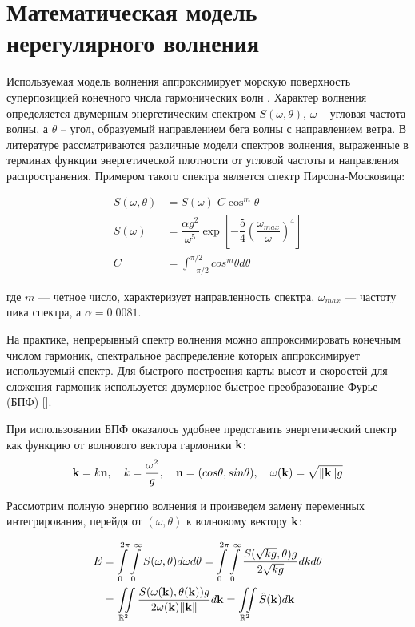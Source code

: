 \section{Математическая модель нерегулярного волнения}

Используемая модель волнения аппроксимирует морскую поверхность суперпозицией конечного числа гармонических волн \cite{lopatuhin2004}. Характер волнения определяется двумерным энергетическим спектром $S(\omega, \theta)$, $\omega$ -- угловая частота волны, а $\theta$ -- угол, образуемый направлением бега волны с направлением ветра. В литературе \cite{lopatuhin2004} рассматриваются различные модели спектров волнения, выраженные в терминах функции энергетической плотности от угловой частоты и направления распространения. Примером такого спектра является спектр Пирсона-Московица:

\begin{equation}
	\begin{split}
	S(\omega, \theta) &= S(\omega) \; C \cos^m\theta \\
	S(\omega) &= \dfrac{\alpha g^2}{\omega^5} \exp \left[ 
	  -\dfrac{5}{4} \left( \dfrac{\omega_{max}}{\omega} \right)^{4} 
	\right]  \\
	C &= \int_{-\pi/2}^{\pi/2} cos^m\theta d\theta
	\end{split}
\end{equation}

где $m$ --- четное число, характеризует направленность спектра, $\omega_{max}$ --- частоту пика спектра, а $\alpha = 0.0081$.

На практике, непрерывный спектр волнения можно аппроксимировать конечным числом гармоник, спектральное распределение которых аппроксимирует используемый спектр. Для быстрого построения карты высот и скоростей для сложения гармоник используется двумерное быстрое преобразование Фурье (БПФ) [].
 
При использовании БПФ оказалось удобнее представить энергетический спектр как функцию от волнового вектора гармоники $\mathbf{k}$:
$$ \mathbf{k} = k\mathbf{n},\quad 
k = \frac{\omega^2}{g} ,\quad 
\mathbf{n}=(cos \theta, sin \theta), \quad 
\omega(\mathbf{k}) = \sqrt{\lVert \mathbf{k} \rVert g} $$

Рассмотрим полную энергию волнения и произведем замену переменных интегрирования, перейдя от $(\omega, \theta)$ к волновому вектору $\mathbf{k}$:

\begin{equation}
	\begin{split}
	E &= \int\limits_0^{2\pi}
		 \int\limits_0^\infty S(\omega, \theta) d\omega d\theta
	  = \int\limits_0^{2\pi}
		 \int\limits_0^\infty 
			 \frac {S(\sqrt{kg}, \theta)g} {2\sqrt{kg}} dk d\theta\\
	  &= \iint\limits_{\mathbb{R}^2}
			 \frac{S(\omega(\mathbf{k}), \theta(\mathbf{k})) g}
				  {2\omega(\mathbf{k}) \lVert \mathbf{k} \rVert} d\mathbf{k}
	  = \iint\limits_{\mathbb{R}^2} \hat{S}(\mathbf{k})d\mathbf{k}
	\end{split}
\end{equation}


